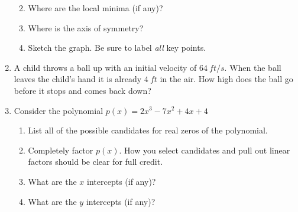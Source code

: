 \documentclass[letterpaper,12pt,fleqn]{article}
\begin{document}
\begin{enumerate}
\begin{enumerate}
    \vspace{0.5in}
    
  \item Where are the local minima (if any)?

    \vspace{0.5in}
    
  \item Where is the axis of symmetry?

    \vspace{0.5in}
    
  \item Sketch the graph. Be sure to label \emph{all} key points.

    \bigskip

    \begin{figure}[h]
      \setlength{\leftskip}{1in}
    \end{figure}
  \end{enumerate}

  \newpage

\item A child throws a ball up with an initial velocity of $\SI{64}{ft/s}$.
  When the ball leaves the child's hand it is already $\SI{4}{ft}$ in the air.
  How high does the ball go before it stops and comes back down?

  \newpage

\item Consider the polynomial $p(x)=2x^3-7x^2+4x+4$
  \begin{enumerate}
  \item List all of the possible candidates for real zeros of the polynomial.

    \vspace{2in}
    
  \item Completely factor $p(x)$. How you select candidates and pull out
    linear factors should be clear for full credit.

    \newpage

  \item What are the $x$ intercepts (if any)?

    \vspace{1in}
    
  \item What are the $y$ intercepts (if any)?


\end{enumerate}
\end{enumerate}
\end{document}

